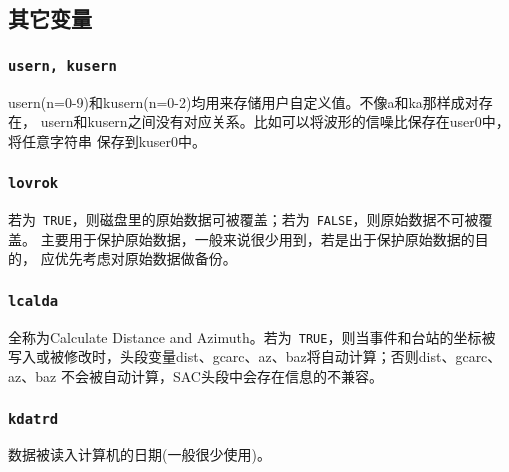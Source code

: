 \subsection{其它变量}
\subsubsection{\texttt{usern, kusern}}
usern(n=0-9)和kusern(n=0-2)均用来存储用户自定义值。不像a和ka那样成对存在，
usern和kusern之间没有对应关系。比如可以将波形的信噪比保存在user0中，将任意字符串
保存到kuser0中。

\subsubsection{\texttt{lovrok}}
若为~\verb+TRUE+，则磁盘里的原始数据可被覆盖；若为~\verb+FALSE+，则原始数据不可被覆盖。
主要用于保护原始数据，一般来说很少用到，若是出于保护原始数据的目的，
应优先考虑对原始数据做备份。

\subsubsection{\texttt{lcalda}}
全称为Calculate Distance and Azimuth。若为~\verb+TRUE+，则当事件和台站的坐标被
写入或被修改时，头段变量dist、gcarc、az、baz将自动计算；否则dist、gcarc、az、baz
不会被自动计算，SAC头段中会存在信息的不兼容。

\subsubsection{\texttt{kdatrd}}
数据被读入计算机的日期(一般很少使用)。
